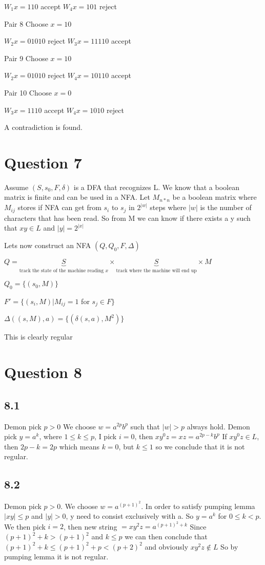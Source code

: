 \documentclass[a4paper, 11pt]{article}
\begin{document}
$W_1x = 110$ accept $W_4x = 101$ reject

Pair 8
Choose $x = 10$

$W_2x = 01010$ reject $W_3x = 11110$ accept

Pair 9
Choose $x = 10$

$W_2x = 01010$ reject $W_4x = 10110$ accept

Pair 10
Choose $x = 0$

$W_3x = 1110$ accept $W_4x = 1010$ reject

A contradiction is found.

\section*{Question 7}

Assume $(S,s_0,F,\delta)$ is a DFA that recognizes L.
We know that a boolean matrix is finite and can be used in a NFA.
Let $M_{n*n}$ be a boolean matrix where $M_{ij}$ stores if NFA can get from $s_i$ to $s_j$ in $2^{|w|}$ steps where $|w|$ is the number of characters that has been read. So from M we can know if there exists a y such that $xy \in L$ and $|y| = 2^{|x|}$

Lets now construct an NFA $(Q,Q_0,F,\Delta)$

$Q = \underbrace{S}_{\text{track the state of the machine reading } x}
  \times \underbrace{S}_{\text{track where the machine will end up}} \times M$
  
$Q_0= \{(s_0, M)\}$

$F'= \{(s_i, M) | M_{ij} = 1 $ for $ s_j \in F\}$

$\Delta((s,M),a)=\{(\delta(s,a),M^2)\}$

This is clearly regular


\section*{Question 8}
\subsection*{8.1}
Demon pick $p > 0$ We choose $w=a^{2p}b^{p}$ such that $|w|>p$ always hold. Demon pick $y=a^{k}$, where $1\leq{k}\leq{p}$, I pick $i=0$, then $xy^{0}z=xz=a^{2p-k}b^{p}$
If $xy^{0}z\in{L}$, then $2p-k = 2p$ which means $k = 0$, but $k \leq {1}$ so we conclude that it is not regular.

\subsection*{8.2}
Demon pick $p > 0$. We choose $w=a^{(p+1)^2}$. In order to satisfy pumping lemma $|xy|\leq{p}$ and $|y|>0$, y need to consist exclusively with a. So $y=a^k$ for $0\leq{k}<p$. We then pick $i=2$, then new string $= xy^2z = a^{(p+1)^2+k}$ Since $(p+1)^2+k > (p+1)^2$ and $k\leq{p}$ we can then conclude that  $(p+1)^2+k\leq{(p+1)^2+p}<(p+2)^2$ and obviously $xy^2z \notin L$ So by pumping lemma it is not regular.
\end{document}
